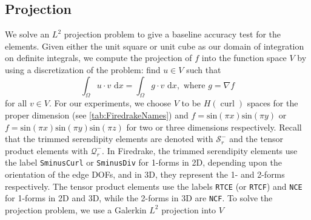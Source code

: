 \documentclass[format=acmsmall,screen,timestamp=false,a4paper]{acmart}
\DeclareMathOperator{\curl}{curl}
\newcommand\akg[1]{\textbf{\textcolor[rgb]{.5,0,1}{[Andrew: #1]}}}
\newcommand\josh[1]{\textbf{\textcolor[rgb]{0,.5,1}{[Josh: #1]}}}
\newcommand{\hcurl}{\ensuremath{{H}(\curl)}\xspace}
\begin{document}



\subsection{Projection}
  
We solve an $L^2$ projection problem to give a baseline accuracy test for the elements. Given either the unit square or unit cube as our domain of integration on definite integrals, we compute the projection of $f$ into the function space $V$ by using a discretization of the problem: find $u\in V$ such that
\begin{equation*}
  \int_\Omega u \cdot v \text{ d}x = \int_\Omega g \cdot v \text{ d}x, \text{ where } g = \nabla f
\end{equation*}
for all $v \in V$.  For our experiments, we choose $V$ to be \hcurl spaces for the proper dimension (see \cref{tab:FiredrakeNames}) and $f = \text{sin}(\pi x)\text{sin}(\pi y)$ or $f=\text{sin}(\pi x)\text{sin}(\pi y)\text{sin}(\pi z)$ for two or three dimensions respectively.
Recall that the trimmed serendipity elements are denoted with $\mathcal{S}_r^-$ and the tensor product elements with $\mathcal{Q}^-_r$.  In Firedrake, the trimmed serendipity elements use the label \texttt{SminusCurl} or \texttt{SminusDiv} for 1-forms in 2D, depending upon the orientation of the edge DOFs, and in 3D, they represent the 1- and 2-forms respectively.  The tensor product elements use the labels \texttt{RTCE} (or \texttt{RTCF}) and  \texttt{NCE} for 1-forms in 2D and 3D, while the 2-forms in 3D are  \texttt{NCF}.  To solve the projection problem, we use a Galerkin $L^2$ projection into $V$



\end{document}
